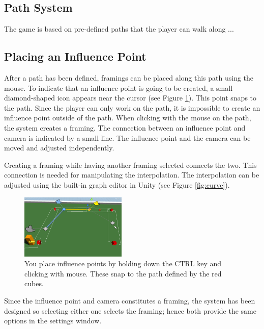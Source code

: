 \subsection{Path System}
The game is based on pre-defined paths that the player can walk along ...

\subsection{Placing an Influence Point}
After a path has been defined, framings can be placed along this path using the mouse. To indicate that an influence point is going to be created, a small diamond-shaped icon appears near the cursor (see Figure \ref{fig:placingInfluencePoint}). This point snaps to the path. Since the player can only work on the path, it is impossible to create an influence point outside of the path. When clicking with the mouse on the path, the system creates a framing. The connection between an influence point and camera is indicated by a small line. The influence point and the camera can be moved and adjusted independently.

Creating a framing while having another framing selected connects the two. This connection is needed for manipulating the interpolation. The interpolation can be adjusted using the built-in graph editor in Unity (see Figure \ref{fig:curve}).

\begin{figure}[htbp]
\centering
\includegraphics[width=0.45\textwidth]{Pics/placingInfluencePoint}
\caption{You place influence points by holding down the CTRL key and clicking with mouse. These snap to the path defined by the red cubes.}
\label{fig:placingInfluencePoint}
\end{figure}


Since the influence point and camera constitutes a framing, the system has been designed so selecting either one selects the framing; hence both provide the same options in the settings window.

